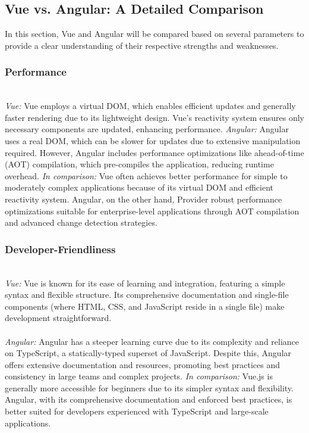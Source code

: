 \documentclass[conference]{IEEEtran}
\begin{document}

\subsection{Vue vs. Angular: A Detailed Comparison}

In this section, Vue and Angular will be compared based on several parameters to provide a clear understanding of their respective strengths and weaknesses.
\newline
\subsubsection{Performance}

\textit{\\Vue:} Vue employs a virtual DOM, which enables efficient updates and generally faster rendering due to its lightweight design. Vue’s reactivity system ensures only necessary components are updated, enhancing performance.
\newline\textit{Angular:} Angular uses a real DOM, which can be slower for updates due to extensive manipulation required. However, Angular includes performance optimizations like ahead-of-time (AOT) compilation, which pre-compiles the application, reducing runtime overhead.
\newline\textit{In comparison:} Vue often achieves better performance for simple to moderately complex applications because of its virtual DOM and efficient reactivity system. Angular, on the other hand, Provider robust performance optimizations suitable for enterprise-level applications through AOT compilation and advanced change detection strategies.
\newline
\subsubsection{Developer-Friendliness}
\textit{\\Vue:} Vue is known for its ease of learning and integration, featuring a simple syntax and flexible structure. Its comprehensive documentation and single-file components (where HTML, CSS, and JavaScript reside in a single file) make development straightforward.
\newline\textit{\\\\Angular:} Angular has a steeper learning curve due to its complexity and reliance on TypeScript, a statically-typed superset of JavaScript. Despite this, Angular offers extensive documentation and resources, promoting best practices and consistency in large teams and complex projects.
\newline\textit{In comparison:} Vue.js is generally more accessible for beginners due to its simpler syntax and flexibility. Angular, with its comprehensive documentation and enforced best practices, is better suited for developers experienced with TypeScript and large-scale applications.
\newline
\end{document}
